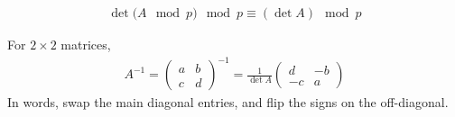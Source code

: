 \begin{proposition}[?]

\begin{align*}
\det{(A \mod p}) \mod p \equiv (\det{A}) \mod p
\end{align*}

\end{proposition}

\begin{proposition}

For \(2\times 2\) matrices,
\begin{align*}
A^{-1} = \left( \begin{array}{cc} a & b \\ c & d \end{array}\right)^{-1} = \frac{1}{\det{A}}\left( \begin{array}{cc} d & -b \\ -c & a \end{array}\right)
\end{align*} In words, swap the main diagonal entries, and flip the
signs on the off-diagonal.

\end{proposition}

